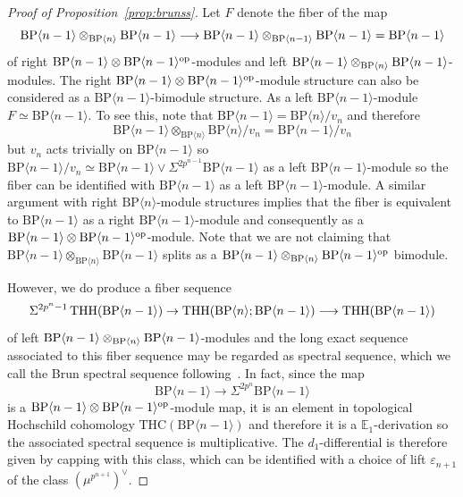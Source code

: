 \begin{proof}[Proof of Proposition~\ref{prop:brunss}]
Let $F$ denote the fiber of the map 
\[ 
\mathrm{BP}\langle n-1\rangle\otimes_{\mathrm{BP}\langle n\rangle}\mathrm{BP}\langle n-1\rangle \longrightarrow \mathrm{BP}\langle n-1\rangle \otimes_{\mathrm{BP}\langle n-1\rangle}\mathrm{BP}\langle n-1\rangle =\mathrm{BP}\langle n-1\rangle 
\]
of right $\mathrm{BP}\langle n-1\rangle \otimes \mathrm{BP}\langle n-1\rangle^{\mathrm{op}}$-modules and left $\mathrm{BP}\langle n-1\rangle\otimes_{\mathrm{BP}\langle n\rangle}\mathrm{BP}\langle n-1\rangle$-modules. The right $\mathrm{BP}\langle n-1\rangle \otimes \mathrm{BP}\langle n-1\rangle^{\mathrm{op}}$-module structure can also be considered as a $\mathrm{BP}\langle n-1\rangle$-bimodule structure. As a left $\mathrm{BP}\langle n-1\rangle$-module $F\simeq \mathrm{BP}\langle n-1\rangle$. To see this, note that $\mathrm{BP}\langle n-1 \rangle=\mathrm{BP}\langle n\rangle/v_n$ and therefore 
\[ \mathrm{BP}\langle n-1 \rangle\otimes_{\mathrm{BP}\langle n\rangle} \mathrm{BP}\langle n\rangle/v_n=\mathrm{BP}\langle n-1 \rangle/v_n\]
but $v_n$ acts trivially on $\mathrm{BP}\langle n-1 \rangle$ so $\mathrm{BP}\langle n-1 \rangle/v_n\simeq \mathrm{BP}\langle n-1 \rangle\vee \Sigma^{2p^{n-1}}\mathrm{BP}\langle n-1 \rangle$ as a left $\mathrm{BP}\langle n-1 \rangle$-module so the fiber can be identified with $\mathrm{BP}\langle n-1 \rangle$ as a left $\mathrm{BP}\langle n-1 \rangle$-module. A similar argument with right 
$\mathrm{BP}\langle n\rangle$-module structures implies that the fiber is equivalent to $\mathrm{BP}\langle n-1\rangle$ as a right $\mathrm{BP}\langle n-1\rangle$-module and consequently as a $\mathrm{BP}\langle n-1\rangle\otimes \mathrm{BP}\langle n-1\rangle^{\mathrm{op}}$-module. Note that we are not claiming that $\mathrm{BP}\langle n-1\rangle \otimes_{\mathrm{BP}\langle n\rangle}\mathrm{BP}\langle n-1\rangle$ splits as a $\mathrm{BP}\langle n-1\rangle \otimes_{\mathrm{BP}\langle n\rangle}\mathrm{BP}\langle n-1\rangle^{\mathrm{op}}$ bimodule. 

However, we do produce a fiber sequence 
\[ 
\Sigma^{2p^{n}-1}\operatorname{THH}(\mathrm{BP}\langle n-1 \rangle)\to  \operatorname{THH}( \mathrm{BP}\langle n \rangle;\mathrm{BP}\langle n-1 \rangle)\longrightarrow \operatorname{THH}(\mathrm{BP}\langle n-1 \rangle)
\]
of left $\mathrm{BP}\langle n-1\rangle \otimes_{\mathrm{BP}\langle n \rangle }\mathrm{BP}\langle n-1\rangle $-modules 
and the long exact sequence associated to this fiber sequence may be regarded as spectral sequence, which we call the Brun spectral sequence following~\cite{Hon20}. In fact, since the map 
\[ \mathrm{BP}\langle n-1\rangle \to \Sigma^{2p^{n}}\mathrm{BP}\langle n-1\rangle 
\]
is a $\mathrm{BP}\langle n-1\rangle \otimes \mathrm{BP}\langle n-1\rangle^{\mathrm{op}}$-module map, it is an element in topological Hochschild cohomology $\mathrm{THC}(\mathrm{BP}\langle n-1\rangle)$ and therefore it is a $\mathbb{E}_1$-derivation so the associated spectral sequence is multiplicative. The $d_1$-differential is therefore given by capping with this class, which can be identified with a choice of lift $\varepsilon_{n+1}$ of the class $(\mu^{p^{n+1}})^{\vee}$. 
\end{proof}
